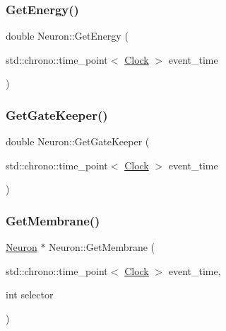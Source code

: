 \mbox{\label{classNeuron_a91dd5325856e246d98c2864e1c955972}} 
\subsubsection{\texorpdfstring{Get\+Energy()}{GetEnergy()}}
{\footnotesize\ttfamily double Neuron\+::\+Get\+Energy (\begin{DoxyParamCaption}\item[{std\+::chrono\+::time\+\_\+point$<$ \mbox{\hyperlink{universe_8h_a0ef8d951d1ca5ab3cfaf7ab4c7a6fd80}{Clock}} $>$}]{event\+\_\+time }\end{DoxyParamCaption})\hspace{0.3cm}{\ttfamily [inline]}}

\mbox{\label{classNeuron_a94accac3223afdecd1edf25e6db59ace}} 
\subsubsection{\texorpdfstring{Get\+Gate\+Keeper()}{GetGateKeeper()}}
{\footnotesize\ttfamily double Neuron\+::\+Get\+Gate\+Keeper (\begin{DoxyParamCaption}\item[{std\+::chrono\+::time\+\_\+point$<$ \mbox{\hyperlink{universe_8h_a0ef8d951d1ca5ab3cfaf7ab4c7a6fd80}{Clock}} $>$}]{event\+\_\+time }\end{DoxyParamCaption})\hspace{0.3cm}{\ttfamily [inline]}}

\mbox{\label{classNeuron_a5bc4e67c5f2d8a3bcd160aa3f5086aec}} 
\subsubsection{\texorpdfstring{Get\+Membrane()}{GetMembrane()}}
{\footnotesize\ttfamily \mbox{\hyperlink{classNeuron}{Neuron}} $\ast$ Neuron\+::\+Get\+Membrane (\begin{DoxyParamCaption}\item[{std\+::chrono\+::time\+\_\+point$<$ \mbox{\hyperlink{universe_8h_a0ef8d951d1ca5ab3cfaf7ab4c7a6fd80}{Clock}} $>$}]{event\+\_\+time,  }\item[{int}]{selector }\end{DoxyParamCaption})}

